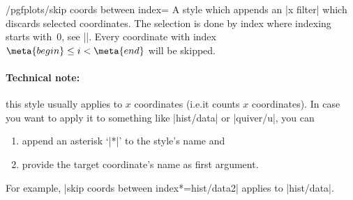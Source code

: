\begin{stylekey}{/pgfplots/skip coords between index=}
    A style which appends an |x filter| which discards selected coordinates.
    The selection is done by index where indexing starts with~$0$, see
    |\coordindex|. Every coordinate with index $\meta{begin} \le i <
    \meta{end}$ will be skipped.
\begin{codeexample}[]
\end{codeexample}

    \paragraph{Technical note:}

    this style usually applies to $x$ coordinates (i.e.\@ it counts $x$
    coordinates). In case you want to apply it to something like |hist/data| or
    |quiver/u|, you can
    \begin{enumerate}
        \item append an asterisk `|*|' to the style's name and
        \item provide the target coordinate's name as first argument.
    \end{enumerate}
    For example, |skip coords between index*={hist/data}{2}| applies to
    |hist/data|.
\end{stylekey}


